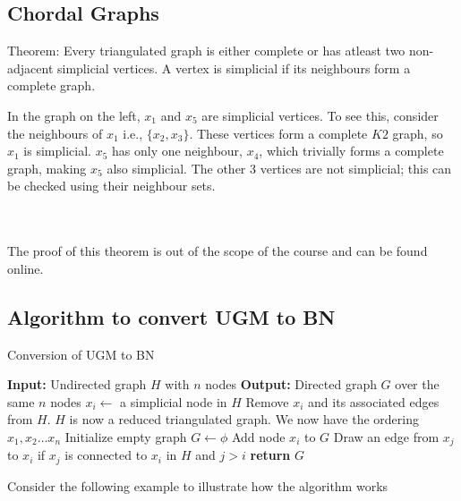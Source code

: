 \documentclass[a4paper]{article}
\begin{document}
\subsection*{Chordal Graphs}
Theorem: Every triangulated graph is either complete or has atleast two non-adjacent simplicial vertices. A vertex is simplicial if its neighbours form a complete graph.


\begin{minipage}{0.30\textwidth}
    \centering
\end{minipage}
\hfill
\begin{minipage}{0.60\textwidth}
    In the graph on the left, $x_1$ and $x_5$ are simplicial vertices. To see this, consider the neighbours of $x_1$ i.e., $\{x_2, x_3\}$. These vertices form a complete $K2$ graph, so $x_1$ is simplicial. $x_5$ has only one neighbour, $x_4$, which trivially forms a complete graph, making $x_5$ also simplicial. The other 3 vertices are not simplicial; this can be checked using their neighbour sets.
\end{minipage}\\~\\
The proof of this theorem is out of the scope of the course and can be found online.
\subsection{Algorithm to convert UGM to BN}
\begin{algorithm}
\caption{Conversion of UGM to BN}\label{alg:template}
\begin{algorithmic}[1]
    \STATE \textbf{Input:} Undirected graph $H$ with $n$ nodes
    \STATE \textbf{Output:} Directed graph $G$ over the same $n$ nodes
        \STATE $x_i\xleftarrow{}$ a simplicial node in $H$
        \STATE Remove $x_i$ and its associated edges from $H$. $H$ is now a reduced triangulated graph.
    \ENDFOR
    \STATE We now have the ordering $x_1, x_2 \dots x_n$
    \STATE Initialize empty graph $G \xleftarrow{} \phi$
        \STATE Add node $x_i$ to $G$
        \STATE Draw an edge from $x_j$ to $x_i$ if $x_j$ is connected to $x_i$ in $H$ and $j>i$
    \ENDFOR
    \STATE \textbf{return} $G$
\end{algorithmic}
\end{algorithm}
Consider the following example to illustrate how the algorithm works
\end{document}
